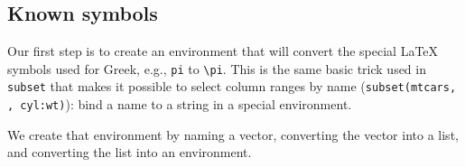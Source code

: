 \subsection{Known symbols}

Our first step is to create an environment that will convert the special
LaTeX symbols used for Greek, e.g., \texttt{pi} to
\texttt{\textbackslash{}pi}. This is the same basic trick used in
\texttt{subset} that makes it possible to select column ranges by name
(\texttt{subset(mtcars, , cyl:wt)}): bind a name to a string in a
special environment.

We create that environment by naming a vector, converting the vector
into a list, and converting the list into an environment.

\begin{Shaded}
\begin{Highlighting}[]
\StringTok{ }\NormalTok{(}
  \NormalTok{, }\NormalTok{, }\NormalTok{, }\NormalTok{, }\NormalTok{, }\NormalTok{, }\NormalTok{,}
  \NormalTok{, }\NormalTok{, }\NormalTok{, }\NormalTok{, }\NormalTok{, }\NormalTok{, }\NormalTok{,}
  \NormalTok{, }\NormalTok{, }\NormalTok{, }\NormalTok{, }\NormalTok{, }\NormalTok{,}
  \NormalTok{, }\NormalTok{, }\NormalTok{, }\NormalTok{, }\NormalTok{, }\NormalTok{, }\NormalTok{, }\NormalTok{,}
  \NormalTok{, }\NormalTok{, }\NormalTok{, }\NormalTok{, }\NormalTok{, }\NormalTok{, }\NormalTok{, }
  \NormalTok{, }\NormalTok{, }\NormalTok{, }\NormalTok{, }\NormalTok{)}
\StringTok{ }\NormalTok{(}\NormalTok{(}\CharTok{\textbackslash{}\textbackslash{}}
\StringTok{ }\NormalTok{(} \NormalTok{())}
\end{Highlighting}
\end{Shaded}

